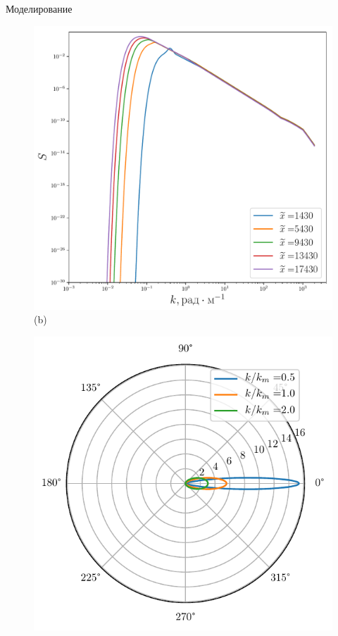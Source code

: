 \begin{frame}[t]{}
\begin{columns}[t]
\begin{column}{.48\linewidth}
\begin{block}{Моделирование}
\begin{figure}[h]
\begin{minipage}{0.24\linewidth}
                \includegraphics[width=\linewidth]{fig/full_spectrum2}
                \centering
                (b)
            \end{minipage}
            \begin{minipage}{0.24\linewidth}
                \includegraphics[width=\linewidth]{fig/full_angles1}

\end{minipage}
\end{figure}
\end{block}
\end{column}
\end{columns}
\end{frame}
